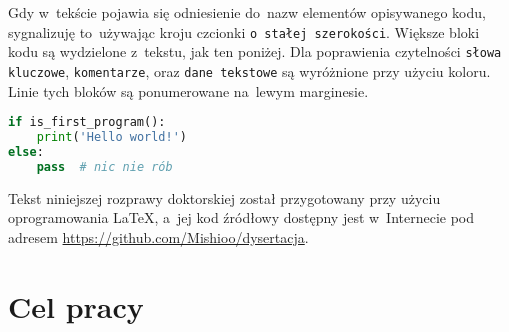Gdy w~tekście pojawia się odniesienie do~nazw elementów opisywanego kodu,
sygnalizuję to~używając kroju czcionki \lstinline!o stałej szerokości!.
Większe bloki kodu są wydzielone z~tekstu, jak ten poniżej.
Dla poprawienia czytelności 
\lstinline[basicstyle=\ttfamily\color{wongvermillion},columns=fixed]!słowa kluczowe!, 
\lstinline[basicstyle=\ttfamily\color{wongsky},columns=fixed]!komentarze!, oraz 
\lstinline[basicstyle=\ttfamily\color{wonggreen},columns=fixed]!dane tekstowe!
są wyróżnione przy użyciu koloru.
Linie tych bloków są ponumerowane na~lewym marginesie.

\begin{lstlisting}[language=Python]
if is_first_program():
    print('Hello world!')
else:
    pass  # nic nie rób
\end{lstlisting}

Tekst niniejszej rozprawy doktorskiej został przygotowany przy użyciu oprogramowania \LaTeX,
a~jej kod źródłowy dostępny jest w~Internecie pod adresem \url{https://github.com/Mishioo/dysertacja}.

\begin{fullwidth}
\printglossary[title=Wykaz skrótów, type=\acronymtype]
\end{fullwidth}

\section{Cel pracy}\label{intro:goal}
